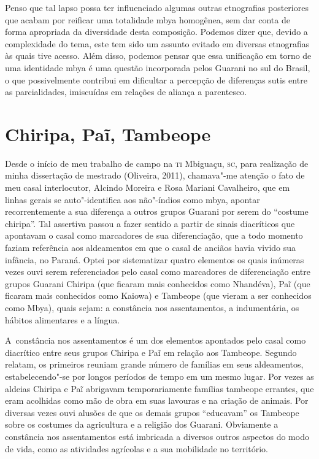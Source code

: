 Penso que tal lapso possa ter influenciado algumas outras etnografias
posteriores que acabam por reificar uma totalidade mbya homogênea, sem
dar conta de forma apropriada da diversidade desta composição. Podemos
dizer que, devido a complexidade do tema, este tem sido um assunto
evitado em diversas etnografias às quais tive acesso. Além disso,
podemos pensar que essa unificação em torno de uma identidade mbya é
uma questão incorporada pelos Guarani no sul do Brasil, o que
possivelmente contribui em dificultar a percepção de diferenças sutis
entre as parcialidades, imiscuídas em relações de aliança a parentesco.

\section{Chiripa, Paĩ, Tambeope}

Desde o início de meu trabalho de campo na \textsc{ti} Mbiguaçu, \textsc{sc}, para
realização de minha dissertação de mestrado (Oliveira, 2011),
chamava"-me atenção o fato de meu casal interlocutor, Alcindo Moreira e
Rosa Mariani Cavalheiro, que em linhas gerais se auto"-identifica aos
não"-índios como mbya, apontar recorrentemente a sua diferença a outros
grupos Guarani por serem do ``costume chiripa''. Tal assertiva passou a
fazer sentido a partir de sinais diacríticos que apontavam o casal como
marcadores de sua diferenciação, que a todo momento faziam referência
aos aldeamentos em que o casal de anciãos havia vivido sua infância, no
Paraná. Optei por sistematizar quatro elementos os quais
inúmeras vezes ouvi serem referenciados pelo casal como marcadores de
diferenciação entre grupos Guarani Chiripa (que ficaram mais conhecidos
como Nhandéva), Paĩ (que ficaram mais conhecidos
como Kaiowa) e Tambeope (que vieram a ser conhecidos como Mbya), quais
sejam: a constância nos assentamentos, a indumentária, os hábitos
alimentares e a língua. 

A~constância nos assentamentos é um dos elementos apontados pelo casal
como diacrítico entre seus grupos Chiripa e Paĩ
em relação aos Tambeope. Segundo relatam, os primeiros reuniam grande
número de famílias em seus aldeamentos, estabelecendo"-se por longos
períodos de tempo em um mesmo lugar. Por vezes as aldeias Chiripa e
Paĩ abrigavam temporariamente famílias tambeope
errantes, que eram acolhidas como mão de obra em suas lavouras e na
criação de animais. Por diversas vezes ouvi alusões de que os demais
grupos ``educavam'' os Tambeope sobre os costumes da agricultura e a
religião dos Guarani. Obviamente a constância nos assentamentos está
imbricada a diversos outros aspectos do modo de vida, como as
atividades agrícolas e a sua mobilidade no território.


